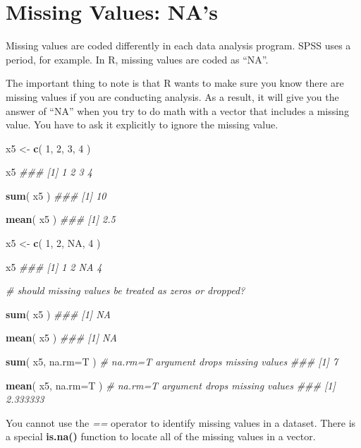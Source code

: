 \documentclass[]{book}
\newenvironment{Shaded}{\begin{snugshade}}{\end{snugshade}}
\newcommand{\CommentTok}[1]{\textcolor[rgb]{0.56,0.35,0.01}{\textit{#1}}}
\newcommand{\DataTypeTok}[1]{\textcolor[rgb]{0.13,0.29,0.53}{#1}}
\newcommand{\DecValTok}[1]{\textcolor[rgb]{0.00,0.00,0.81}{#1}}
\newcommand{\KeywordTok}[1]{\textcolor[rgb]{0.13,0.29,0.53}{\textbf{#1}}}
\newcommand{\NormalTok}[1]{#1}
\newcommand{\OtherTok}[1]{\textcolor[rgb]{0.56,0.35,0.01}{#1}}
\newcommand{\StringTok}[1]{\textcolor[rgb]{0.31,0.60,0.02}{#1}}
\theoremstyle{definition}
\theoremstyle{definition}
\theoremstyle{definition}
\theoremstyle{remark}
\begin{document}
\hypertarget{missing-values-nas}{%
\section{Missing Values: NA's}\label{missing-values-nas}}

Missing values are coded differently in each data analysis program. SPSS
uses a period, for example. In R, missing values are coded as ``NA''.

The important thing to note is that R wants to make sure you know there
are missing values if you are conducting analysis. As a result, it will
give you the answer of ``NA'' when you try to do math with a vector that
includes a missing value. You have to ask it explicitly to ignore the
missing value.

\begin{Shaded}
\begin{Highlighting}[]
\NormalTok{x5 <-}\StringTok{ }\KeywordTok{c}\NormalTok{( }\DecValTok{1}\NormalTok{, }\DecValTok{2}\NormalTok{, }\DecValTok{3}\NormalTok{, }\DecValTok{4}\NormalTok{ )}

\NormalTok{x5}
\CommentTok{### [1] 1 2 3 4}

\KeywordTok{sum}\NormalTok{( x5 )}
\CommentTok{### [1] 10}

\KeywordTok{mean}\NormalTok{( x5 )}
\CommentTok{### [1] 2.5}

\NormalTok{x5 <-}\StringTok{ }\KeywordTok{c}\NormalTok{( }\DecValTok{1}\NormalTok{, }\DecValTok{2}\NormalTok{, }\OtherTok{NA}\NormalTok{, }\DecValTok{4}\NormalTok{ )}

\NormalTok{x5}
\CommentTok{### [1]  1  2 NA  4}

\CommentTok{# should missing values be treated as zeros or dropped? }

\KeywordTok{sum}\NormalTok{( x5 )}
\CommentTok{### [1] NA}

\KeywordTok{mean}\NormalTok{( x5 )}
\CommentTok{### [1] NA}

\KeywordTok{sum}\NormalTok{( x5, }\DataTypeTok{na.rm=}\NormalTok{T )   }\CommentTok{# na.rm=T argument drops missing values}
\CommentTok{### [1] 7}

\KeywordTok{mean}\NormalTok{( x5, }\DataTypeTok{na.rm=}\NormalTok{T )  }\CommentTok{# na.rm=T argument drops missing values}
\CommentTok{### [1] 2.333333}
\end{Highlighting}
\end{Shaded}

You cannot use the \emph{==} operator to identify missing values in a
dataset. There is a special \textbf{is.na()} function to locate all of
the missing values in a vector.
\end{document}
